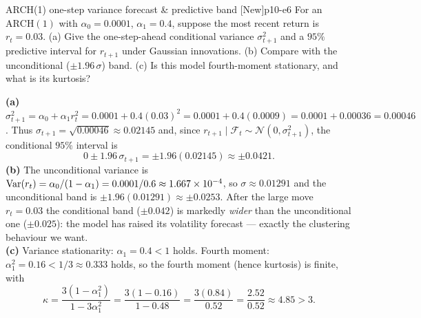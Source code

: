 \begin{exercise}{ARCH(1) one-step variance forecast \& predictive band \quad\textnormal{[New]}}{p10-e6}
For an $\mathrm{ARCH}(1)$ with $\alpha_0=0.0001$, $\alpha_1=0.4$, suppose the most
recent return is $r_t=0.03$. (a) Give the one-step-ahead conditional variance
$\sigma_{t+1}^2$ and a $95\%$ predictive interval for $r_{t+1}$ under Gaussian
innovations. (b) Compare with the unconditional ($\pm1.96\,\sigma$) band.
(c) Is this model fourth-moment stationary, and what is its kurtosis?
\end{exercise}
\begin{solution}
\textbf{(a)} $\sigma_{t+1}^2=\alpha_0+\alpha_1 r_t^2
=0.0001+0.4(0.03)^2=0.0001+0.4(0.0009)=0.0001+0.00036=0.00046$. Thus
$\sigma_{t+1}=\sqrt{0.00046}\approx0.02145$ and, since
$r_{t+1}\mid\mathcal F_t\sim\mathcal N(0,\sigma_{t+1}^2)$, the conditional $95\%$
interval is
\[
0\pm1.96\,\sigma_{t+1}=\pm1.96(0.02145)\approx\pm0.0421 .
\]
\textbf{(b)} The unconditional variance is
$\operatorname{Var}(r_t)=\alpha_0/(1-\alpha_1)=0.0001/0.6\approx1.667\times10^{-4}$, so
$\sigma\approx0.01291$ and the unconditional band is
$\pm1.96(0.01291)\approx\pm0.0253$. After the large move $r_t=0.03$ the
conditional band ($\pm0.042$) is markedly \emph{wider} than the unconditional one
($\pm0.025$): the model has raised its volatility forecast --- exactly the
clustering behaviour we want.\\
\textbf{(c)} Variance stationarity: $\alpha_1=0.4<1$ holds. Fourth moment:
$\alpha_1^2=0.16<1/3\approx0.333$ holds, so the fourth moment (hence kurtosis) is
finite, with
\[
\kappa=\frac{3(1-\alpha_1^2)}{1-3\alpha_1^2}=\frac{3(1-0.16)}{1-0.48}
=\frac{3(0.84)}{0.52}=\frac{2.52}{0.52}\approx4.85>3 .
\]
\end{solution}

